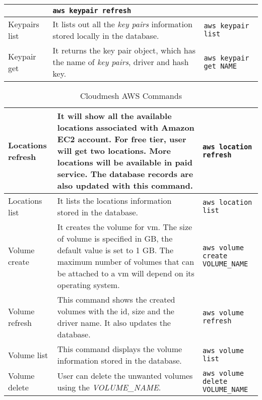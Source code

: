 \documentclass[9pt,twocolumn,twoside]{../../styles/osajnl}
\begin{document}
\begin{table*}[p]
\begin{center}
\begin{tabular}{p{2cm}p{10cm}p{5cm}}
                         & \verb+aws keypair refresh+ \\
  \hline
  Keypairs list & It lists out all the \textit{key pairs} information stored locally in the database.
                         & \verb+aws keypair list+ \\
  \hline
  Keypair get & It returns the key pair object, which has the name of \textit{key pairs}, driver and hash key.
                         & \verb+aws keypair get NAME+ \\
  \hline
\end{tabular}
\end{center}
\end{table*}


\begin{table*}[htb]
\caption{Cloudmesh AWS Commands}\label{T:aws-commands} 
\begin{center}
\begin{tabular}{p{2cm}p{10cm}p{5cm}}
  Locations refresh & It will show all the available locations associated with Amazon EC2 account. For free tier, user will get two locations. More locations will be available in paid service. The database records are also updated with this command.
                         & \verb+aws location refresh+ \\
  \hline
  Locations list & It lists the locations information stored in the database.
                         & \verb+aws location list+ \\
  \hline
  Volume create & It creates the volume for vm. The size of volume is specified in GB, the default value is set to 1 GB. The maximum number of volumes that can be attached to a vm will depend on its operating system.
                         & \verb+aws volume create VOLUME_NAME+ \\
  \hline
  Volume refresh & This command shows the created volumes with the id, size and the driver name. It also updates the database.
                         & \verb+aws volume refresh+ \\
  \hline
  Volume list & This command displays the volume information stored in the database.
                         & \verb+aws volume list+ \\
  \hline
  Volume delete & User can delete the unwanted volumes using the \textit{VOLUME\_NAME}.
                         & \verb+aws volume delete VOLUME_NAME+ \\
\end{tabular}
\end{center}
\end{table*}
\end{document}
